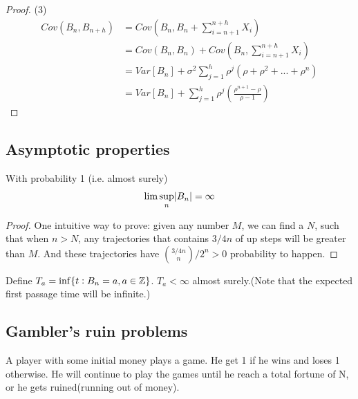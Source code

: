 \begin{refsection}
\begin{proof}
(3)
\begin{align*}
Cov(B_n,B_{n+h}) &= Cov(B_n,B_n + \sum_{i=n+1}^{n+h}X_i) \\
&= Cov(B_n,B_n) + Cov(B_n,\sum_{i=n+1}^{n+h}X_i) \\
&= Var[B_n] + \sigma^2 \sum_{j=1}^h \rho^j(\rho + \rho^2 + ... + \rho^n) \\
&= Var[B_n] + \sum_{j=1}^h \rho^j (\frac{\rho^{n+1} - \rho}{\rho - 1})
\end{align*}
\end{proof}

\subsection{Asymptotic properties}
\begin{lemma}
	With probability 1 (i.e. almost surely)
	$$\lim \sup_n \abs{B_n} = \infty$$
\end{lemma}
\begin{proof}
One intuitive way to prove: given any number $M$, we can find a $N$, such that when $n > N$, any trajectories that contains $3/4n$ of up steps will be greater than $M$. And these trajectories have $\binom{3/4n}{n}/2^n > 0$ probability to happen. 
\end{proof}


\begin{corollary}
Define $T_a = \inf\{t:B_n = a,a\in \mathbb{Z}\}$. $T_a < \infty$ almost surely.(Note that the expected first passage time will be infinite.)
\end{corollary}


\subsection{Gambler's ruin problems}
\begin{definition}
	A player with some initial money plays a game.  He get 1 if he wins and loses 1 otherwise. He will continue to play the games until he reach a total fortune of N, or he gets ruined(running out of money). 
\end{definition}


\end{refsection}
